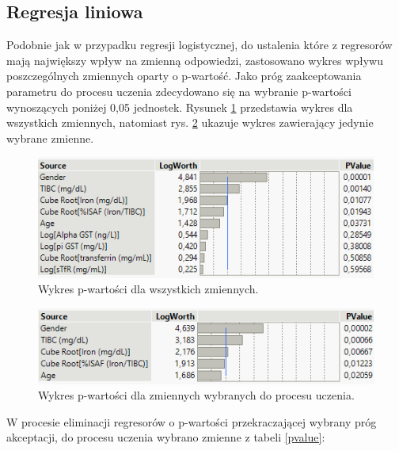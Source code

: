 \subsection{Regresja liniowa}

Podobnie jak w przypadku regresji logistycznej, do ustalenia które z regresorów mają największy wpływ na zmienną odpowiedzi, zastosowano wykres wpływu poszczególnych zmiennych oparty o p-wartość. Jako próg zaakceptowania parametru do procesu uczenia zdecydowano się na wybranie p-wartości wynoszących poniżej 0,05 jednostek. Rysunek \ref{fig:pvalue3} przedstawia wykres dla wszystkich zmiennych, natomiast rys. \ref{fig:pvalue4} ukazuje wykres zawierający jedynie wybrane zmienne. 

\begin{figure}[!ht]
	\centering
	\includegraphics[width=0.6\linewidth]{Rozdzial3/pvalue3}
	\caption{Wykres p-wartości dla wszystkich zmiennych.}
	\label{fig:pvalue3}
\end{figure}

\begin{figure}[!ht]
	\centering
	\includegraphics[width=0.7\linewidth]{Rozdzial3/pvalue4}
	\caption{Wykres p-wartości dla zmiennych wybranych do procesu uczenia.}
	\label{fig:pvalue4}
\end{figure}

W procesie eliminacji regresorów o p-wartości przekraczającej wybrany próg akceptacji, do procesu uczenia wybrano zmienne z tabeli \ref{pvalue}:

